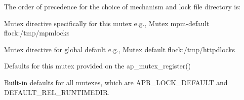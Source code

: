 The order of precedence for the choice of mechanism and lock file directory is\+:


\begin{DoxyEnumerate}
\item Mutex directive specifically for this mutex e.\+g., Mutex mpm-\/default flock\+:/tmp/mpmlocks
\item Mutex directive for global default e.\+g., Mutex default flock\+:/tmp/httpdlocks
\item Defaults for this mutex provided on the ap\+\_\+mutex\+\_\+register()
\item Built-\/in defaults for all mutexes, which are A\+P\+R\+\_\+\+L\+O\+C\+K\+\_\+\+D\+E\+F\+A\+U\+LT and D\+E\+F\+A\+U\+L\+T\+\_\+\+R\+E\+L\+\_\+\+R\+U\+N\+T\+I\+M\+E\+D\+IR.
\end{DoxyEnumerate}


